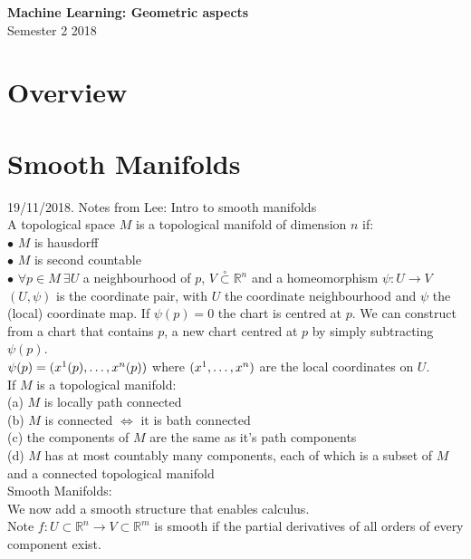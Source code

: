 \documentclass[14pt, twocolumn]{article}
\newcommand{\opsubset}{\overset{\circ}{\subset}}
\newcommand{\R}{\mathbb{R}}
\begin{document}
	\begin{center}
		\Large\textbf{Machine Learning: Geometric aspects}\\
		Semester 2 2018
	\end{center}

	\section*{Overview}

	\section*{Smooth Manifolds}

	19/11/2018. Notes from Lee: Intro to smooth manifolds \\

	A topological space $M$ is a topological manifold of dimension $n$ if:\\
	$\bullet$ $M$ is hausdorff\\
	$\bullet$ $M$ is second countable\\
	$\bullet$ $\forall p \in M \ \exists U$ a neighbourhood of $p$, $V \opsubset \R^n$ and a homeomorphism $\psi:U \to V$\\

	$(U , \psi)$ is the coordinate pair, with $U$ the coordinate neighbourhood and $\psi$ the (local) coordinate map. If $\psi(p) = 0$ the chart is centred at $p$. We can construct from a chart that contains $p$, a new chart centred at $p$ by simply subtracting $\psi(p)$. \\

	$\psi(p) = (x^1(p) , \mathellipsis , x^n(p))$ where $(x^1,\mathellipsis,x^n)$ are the local coordinates on $U$.\\

	If $M$ is a topological manifold:\\

	(a) $M$ is locally path connected\\
	(b) $M$ is connected $\iff$ it is bath connected \\
	(c) the components of $M$ are the same as it's path components\\
	(d) $M$ has at most countably many components, each of which is a subset of $M$ and a connected topological manifold \\

	Smooth Manifolds:\\
	We now add a smooth structure that enables calculus.\\
	Note $f: U \subset \R^n \to V \subset \R^m$ is smooth if the partial derivatives of all orders of every component exist.\\
\end{document}
